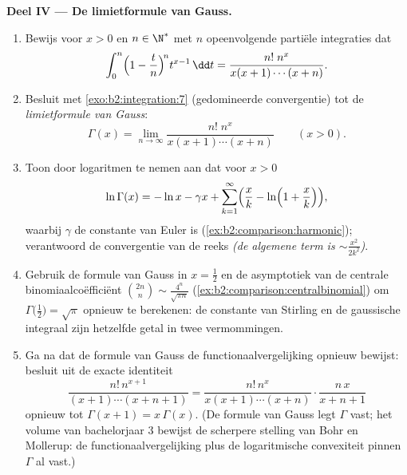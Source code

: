 \begin{problem}
\medskip
\noindent\textbf{Deel IV --- De limietformule van Gauss.}
\begin{enumerate}[resume]
  \item Bewijs voor $x > 0$ en $n \in \N^*$ met $n$
        opeenvolgende partiële integraties dat
        \[
        \int_0^n \Bigl(1 - \frac tn\Bigr)^{\!n} t^{x-1}\,\dd t
        = \frac{n!\;n^x}{x(x+1)\cdots(x+n)} .
        \]
  \item Besluit met \cref{exo:b2:integration:7} (gedomineerde
        convergentie) tot de \emph{limietformule van Gauss}:
        \[
        \Gamma(x) = \lim_{n\to\infty}
        \frac{n!\;n^x}{x(x+1)\cdots(x+n)}
        \qquad (x > 0).
        \]
  \item Toon door logaritmen te nemen aan dat voor $x > 0$
        \[
        \ln\Gamma(x) = -\ln x - \gamma x +
        \sum_{k=1}^{\infty}\Bigl(\frac xk -
        \ln\Bigl(1 + \frac xk\Bigr)\Bigr),
        \]
        waarbij $\gamma$ de constante van Euler is
        (\cref{ex:b2:comparison:harmonic}); verantwoord de
        convergentie van de reeks \emph{(de algemene term is $\sim
        \frac{x^2}{2k^2}$)}.
  \item Gebruik de formule van Gauss in $x = \frac12$ en de
        asymptotiek van de centrale binomiaalcoëfficiënt
        $\binom{2n}{n} \sim \frac{4^n}{\sqrt{\pi n}}$
        (\cref{ex:b2:comparison:centralbinomial}) om
        $\Gamma\bigl(\frac12\bigr) = \sqrt\pi$ opnieuw te
        berekenen: de constante van Stirling en de gaussische
        integraal zijn hetzelfde getal in twee vermommingen.
  \item Ga na dat de formule van Gauss de functionaalvergelijking
        opnieuw bewijst: besluit uit de exacte identiteit
        \[
        \frac{n!\,n^{x+1}}{(x+1)\cdots(x+n+1)}
        = \frac{n!\,n^{x}}{x(x+1)\cdots(x+n)}\cdot
        \frac{n\,x}{x+n+1}
        \]
        opnieuw tot $\Gamma(x+1) = x\,\Gamma(x)$. (De formule van
        Gauss legt $\Gamma$  vast; het volume van
        bachelorjaar 3 bewijst de scherpere stelling van Bohr en
        Mollerup: de functionaalvergelijking plus de logaritmische
        convexiteit pinnen $\Gamma$ al vast.)
\end{enumerate}


\end{problem}
